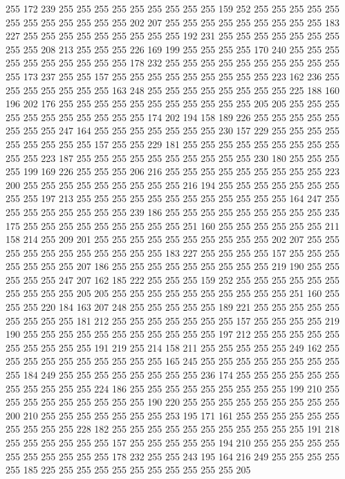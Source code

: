 255 172 239 255 255 255 255 255 255 255 255 255 159 252 255 255 255 255 255 255
255 255 255 255 255 255 202 207 255 255 255 255 255 255 255 255 255 183 227 255
255 255 255 255 255 255 255 255 192 231 255 255 255 255 255 255 255 255 255 208
213 255 255 255 226 169 199 255 255 255 255 170 240 255 255 255 255 255 255 255
255 255 255 178 232 255 255 255 255 255 255 255 255 255 255 255 173 237 255 255
157 255 255 255 255 255 255 255 255 255 223 162 236 255 255 255 255 255 255 255
163 248 255 255 255 255 255 255 255 255 225 188 160 196 202 176 255 255 255 255
255 255 255 255 255 255 255 205 205 255 255 255 255 255 255 255 255 255 255 255
174 202 194 158 189 226 255 255 255 255 255 255 255 255 247 164 255 255 255 255
255 255 255 230 157 229 255 255 255 255 255 255 255 255 255 157 255 255 229 181
255 255 255 255 255 255 255 255 255 255 255 223 187 255 255 255 255 255 255 255
255 255 255 230 180 255 255 255 255 199 169 226 255 255 255 206 216 255 255 255
255 255 255 255 255 255 223 200 255 255 255 255 255 255 255 255 255 216 194 255
255 255 255 255 255 255 255 255 197 213 255 255 255 255 255 255 255 255 255 255
255 255 164 247 255 255 255 255 255 255 255 255 239 186 255 255 255 255 255 255
255 255 255 235 175 255 255 255 255 255 255 255 255 255 251 160 255 255 255 255
255 255 211 158 214 255 209 201 255 255 255 255 255 255 255 255 255 255 202 207
255 255 255 255 255 255 255 255 255 255 255 183 227 255 255 255 255 157 255 255
255 255 255 255 255 207 186 255 255 255 255 255 255 255 255 255 219 190 255 255
255 255 255 247 207 162 185 222 255 255 255 159 252 255 255 255 255 255 255 255
255 255 255 205 205 255 255 255 255 255 255 255 255 255 255 251 160 255 255 255
220 184 163 207 248 255 255 255 255 255 189 221 255 255 255 255 255 255 255 255
255 181 212 255 255 255 255 255 255 255 157 255 255 255 255 219 190 255 255 255
255 255 255 255 255 255 255 255 197 212 255 255 255 255 255 255 255 255 255 255
191 219 255 214 158 211 255 255 255 255 255 249 162 255 255 255 255 255 255 255
255 255 255 165 245 255 255 255 255 255 255 255 255 255 184 249 255 255 255 255
255 255 255 255 236 174 255 255 255 255 255 255 255 255 255 255 255 224 186 255
255 255 255 255 255 255 255 255 199 210 255 255 255 255 255 255 255 255 255 190
220 255 255 255 255 255 255 255 255 255 200 210 255 255 255 255 255 255 255 253
195 171 161 255 255 255 255 255 255 255 255 255 255 228 182 255 255 255 255 255
255 255 255 255 255 255 191 218 255 255 255 255 255 255 157 255 255 255 255 255
194 210 255 255 255 255 255 255 255 255 255 255 255 178 232 255 255 243 195 164
216 249 255 255 255 255 255 185 225 255 255 255 255 255 255 255 255 255 255 205
